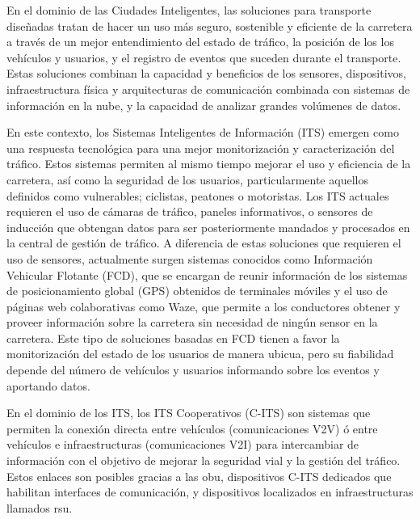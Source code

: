 En el dominio de las Ciudades Inteligentes, las soluciones para transporte diseñadas tratan
de hacer un uso más seguro, sostenible y eficiente de la carretera a través de un mejor
entendimiento del estado de tráfico, la posición de los los vehículos y usuarios, y el
registro de eventos que suceden durante el transporte. Estas soluciones combinan la capacidad
y beneficios de los sensores, dispositivos, infraestructura física y arquitecturas de
comunicación combinada con sistemas de información en la nube, y la capacidad de analizar
grandes volúmenes de datos.

En este contexto, los Sistemas Inteligentes de Información (ITS) emergen como una respuesta
tecnológica para una mejor monitorización y caracterización del tráfico. Estos sistemas
permiten al mismo tiempo mejorar el uso y eficiencia de la carretera, así como la seguridad
de los usuarios, particularmente aquellos definidos como vulnerables; ciclistas, peatones o
motoristas. Los ITS actuales requieren el uso de cámaras de tráfico, paneles informativos,
o sensores de inducción que obtengan datos para ser posteriormente mandados y procesados en
la central de gestión de tráfico. A diferencia de estas soluciones que requieren el uso de
sensores, actualmente surgen sistemas conocidos como Información Vehicular Flotante (FCD),
que se encargan de reunir información de los sistemas de posicionamiento global (GPS) obtenidos
de terminales móviles y el uso de páginas web colaborativas como Waze, que permite a los
conductores obtener y proveer información sobre la carretera sin necesidad de ningún sensor
en la carretera. Este tipo de soluciones basadas en FCD tienen a favor la monitorización del
estado de los usuarios de manera ubicua, pero su fiabilidad depende del número de vehículos y
usuarios informando sobre los eventos y aportando datos.

En el dominio de los ITS, los ITS Cooperativos (C-ITS) son sistemas que permiten la conexión
directa entre vehículos (comunicaciones V2V) ó entre vehículos e infraestructuras
(comunicaciones V2I) para intercambiar de información con el objetivo de mejorar la seguridad
vial y la gestión del tráfico. Estos enlaces son posibles gracias a las \gls{obu}, dispositivos
C-ITS dedicados que habilitan interfaces de comunicación, y dispositivos localizados en
infraestructuras llamados \gls{rsu}.

